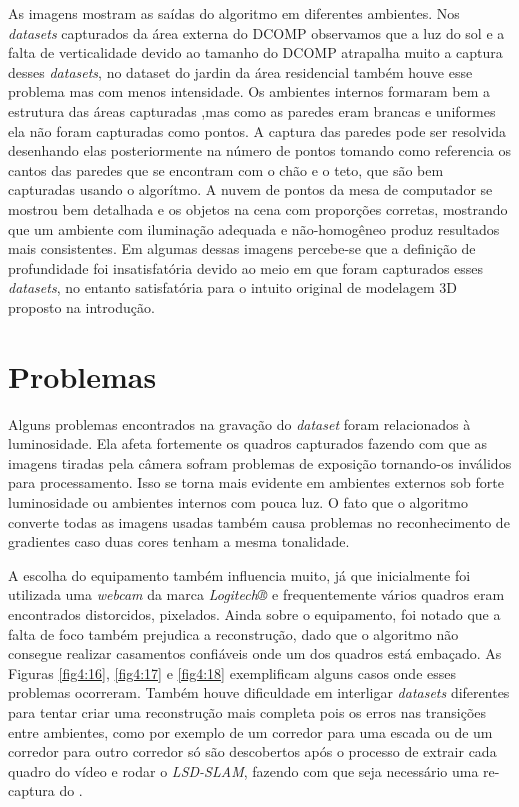 As imagens mostram as saídas do algoritmo em diferentes ambientes. 
Nos \textit{datasets} capturados da área externa do DCOMP observamos que a luz do sol e a falta de verticalidade devido ao tamanho do DCOMP atrapalha muito a captura desses \textit{datasets}, no dataset do jardin da área residencial também houve esse problema mas com menos intensidade. Os ambientes internos formaram bem a estrutura das áreas capturadas  ,mas como as paredes eram brancas e uniformes ela não foram capturadas como pontos. A captura das paredes pode ser resolvida desenhando elas posteriormente na número de pontos tomando como referencia os cantos das paredes que se encontram com o chão e o teto, que são bem capturadas usando o algorítmo. A nuvem de pontos da mesa de computador se mostrou bem detalhada e os objetos na cena com proporções corretas, mostrando que um ambiente com iluminação adequada e não-homogêneo produz resultados mais consistentes.  Em algumas dessas imagens percebe-se que a definição de profundidade foi insatisfatória devido ao meio em que foram capturados esses \textit{datasets}, no entanto satisfatória para o intuito original de modelagem 3D proposto na introdução.

\section{Problemas}

Alguns problemas encontrados na gravação do \textit{dataset} foram relacionados à luminosidade. Ela afeta fortemente os quadros capturados fazendo com que as imagens tiradas pela câmera sofram problemas de exposição tornando-os inválidos para processamento. Isso se torna mais evidente em ambientes externos sob forte luminosidade ou ambientes internos com pouca luz. O fato que o algoritmo converte todas as imagens usadas também causa problemas no reconhecimento de gradientes caso duas cores tenham a mesma tonalidade. 

A escolha do equipamento também influencia muito, já que inicialmente foi utilizada uma \textit{webcam} da marca \textit{Logitech®} e frequentemente vários quadros eram encontrados distorcidos, pixelados. Ainda sobre o equipamento, foi notado que a falta de foco também prejudica a reconstrução, dado que o algoritmo não consegue realizar casamentos confiáveis onde um dos quadros está embaçado. As Figuras \ref{fig4:16}, \ref{fig4:17} e \ref{fig4:18}  exemplificam alguns casos onde esses problemas ocorreram. Também houve dificuldade em interligar  \textit{datasets} diferentes para tentar criar uma reconstrução mais completa pois os erros nas transições entre ambientes, como por exemplo de um corredor para uma escada ou de um corredor para outro corredor só são descobertos após o processo de extrair cada quadro do vídeo e rodar o \textit{LSD-SLAM}, fazendo com que seja necessário uma re-captura do . 

